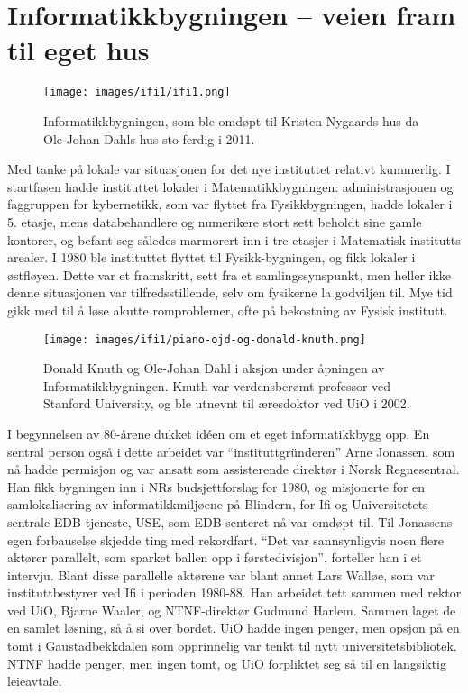 \chapter[Ifi 1]{Informatikkbygningen – veien fram til eget hus}

\label{chap:ifi1}

\author{Skrevet av Narve Trædal}

\begin{figure}[h!]
	\centering
	\texttt{[image: images/ifi1/ifi1.png]}
	\caption{Informatikkbygningen, som ble omdøpt til Kristen Nygaards hus da Ole-Johan Dahls hus sto ferdig i 2011.}
\end{figure}

Med tanke på lokale var situasjonen for det nye instituttet relativt kummerlig. I startfasen hadde instituttet lokaler i Matematikkbygningen: administrasjonen og faggruppen for kybernetikk, som var flyttet fra Fysikkbygningen, hadde lokaler i 5. etasje, mens databehandlere og numerikere stort sett beholdt sine gamle kontorer, og befant seg således marmorert inn i tre etasjer i Matematisk institutts arealer. I 1980 ble instituttet flyttet til Fysikk-bygningen, og fikk lokaler i østfløyen. Dette var et framskritt, sett fra et samlingssynspunkt, men heller ikke denne situasjonen var tilfredsstillende, selv om fysikerne la godviljen til. Mye tid gikk med til å løse akutte romproblemer, ofte på bekostning av Fysisk institutt.

\begin{wrapfigure}{r}{8cm}
\centering
\texttt{[image: images/ifi1/piano-ojd-og-donald-knuth.png]}
	\caption{Donald Knuth og Ole-Johan Dahl i aksjon under åpningen av Informatikkbygningen. Knuth var verdensberømt professor ved Stanford University, og ble utnevnt til æresdoktor ved UiO i 2002.}
\end{wrapfigure}

I begynnelsen av 80-årene dukket idéen om et eget informatikkbygg opp. En sentral person også i dette arbeidet var ``instituttgründeren'' Arne Jonassen, som nå hadde permisjon og var ansatt som assisterende direktør i Norsk Regnesentral. Han fikk bygningen inn i NRs budsjettforslag for 1980, og misjonerte for en samlokalisering av informatikkmiljøene på Blindern, for Ifi og Universitetets sentrale EDB-tjeneste, USE, som EDB-senteret nå var omdøpt til. Til Jonassens egen forbauselse skjedde ting med rekordfart. ``Det var sannsynligvis noen flere aktører parallelt, som sparket ballen opp i førstedivisjon'', forteller han i et intervju. Blant disse parallelle aktørene var blant annet Lars Walløe, som var instituttbestyrer ved Ifi i perioden 1980-88. Han arbeidet tett sammen med rektor ved UiO, Bjarne Waaler, og NTNF-direktør Gudmund Harlem. Sammen laget de en samlet løsning, så å si over bordet. UiO hadde ingen penger, men opsjon på en tomt i Gaustadbekkdalen som opprinnelig var tenkt til nytt universitetsbibliotek. NTNF hadde penger, men ingen tomt, og UiO forpliktet seg så til en langsiktig leieavtale.

